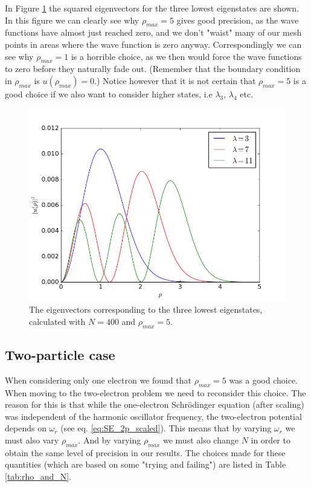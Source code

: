 \documentclass[12pt, a4paper]{article}
\begin{document}
In Figure \ref{fig:eigenvectors_1p} the squared eigenvectors for the three lowest eigenstates are shown. 
In this figure we can clearly see why $\rho_{max} = 5$ gives good precision, as the wave functions have 
almost just reached zero, and we don't "waist" many of our mesh points in areas where the wave function is 
zero anyway. Correspondingly we can see why $\rho_{max} = 1$ is a horrible choice, as we then would 
force the wave functions to zero before they naturally fade out. (Remember that the boundary condition 
in $\rho_{max}$ is $u(\rho_{max}) = 0$.) Notice however that it is not certain that $\rho_{max} = 5$ is
a good choice if we also want to consider higher states, i.e $\lambda_3$, $\lambda_4$ etc. 
\begin{figure}[ht!]
\begin{center}
\includegraphics[scale=0.7]{../Programs/Output/Eigenvectors_1pHO.png}
\caption{The eigenvectors corresponding to the three lowest eigenstates, calculated with $N=400$ and 
$\rho_{max} = 5$.}
\label{fig:eigenvectors_1p}
\end{center}
\end{figure}

\subsection{Two-particle case}

When considering only one electron we found that $\rho_{max}=5$ was a good choice. When moving to the 
two-electron problem we need to reconsider this choice. The reason for this is that while the 
one-electron Schrödinger equation (after scaling) was independent of the harmonic oscillator frequency, 
the two-electron potential depends on $\omega_r$ (see eq. \ref{eq:SE_2p_scaled}). This means that by 
varying $\omega_r$ we must also vary $\rho_{max}$. And by varying $\rho_{max}$ we must also change 
$N$ in order to obtain the same level of precision in our results. The choices made for these quantities 
(which are based on some "trying and failing") are listed in Table \ref{tab:rho_and_N}. 
\end{document}
